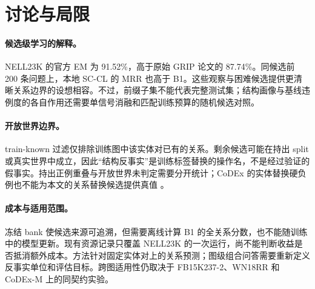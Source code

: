 \section{讨论与局限}

\paragraph{候选级学习的解释。}
NELL23K 的官方 EM 为 91.52\%，高于原始 GRIP 论文的 87.74\%。同候选前 200 条问题上，本地 SC-CL 的 MRR 也高于 B1。这些观察与困难候选提供更清晰关系边界的设想相容。不过，前缀子集不能代表完整测试集；结构画像与基线违例度的各自作用还需要单信号消融和匹配训练预算的随机候选对照。

\paragraph{开放世界边界。}
train-known 过滤仅排除训练图中该实体对已有的关系。剩余候选可能在持出 split 或真实世界中成立，因此“结构反事实”是训练标签替换的操作名，不是经过验证的假事实。持出正例重叠与开放世界未判定需要分开统计；CoDEx 的实体替换硬负例也不能为本文的关系替换候选提供真值 \citep{safavi2020codex}。

\paragraph{成本与适用范围。}
冻结 bank 使候选来源可追溯，但需要离线计算 B1 的全关系分数，也不能随训练中的模型更新。现有资源记录只覆盖 NELL23K 的一次运行，尚不能判断收益是否抵消额外成本。方法针对固定实体对上的关系预测；图级组合问答需要重新定义反事实单位和评估目标。跨图适用性仍取决于 FB15K237-2、WN18RR 和 CoDEx-M 上的同契约实验。
